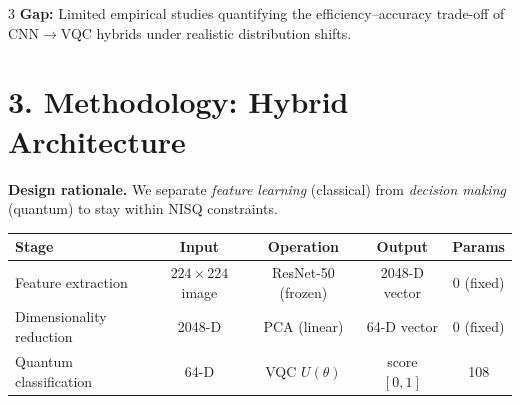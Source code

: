 \documentclass[a0,portrait]{a0poster}
\begin{document}
\begin{multicols}{3}
\noindent
\textbf{Gap:} Limited empirical studies quantifying the efficiency--accuracy trade-off of CNN\(\rightarrow\)VQC hybrids under realistic distribution shifts.


\color{UWBBlue}\section*{3. Methodology: Hybrid Architecture}
\color{TechGrey}

\noindent
\textbf{Design rationale.} We separate \textit{feature learning} (classical) from \textit{decision making} (quantum) to stay within NISQ constraints.
\begin{center}
\footnotesize
\begin{tabular}{lcccc}
\toprule
\textbf{Stage} & \textbf{Input} & \textbf{Operation} & \textbf{Output} & \textbf{Params} \\
\midrule
Feature extraction & \(224 \times 224\) image & ResNet-50 (frozen) & 2048-D vector & 0 (fixed) \\
Dimensionality reduction & 2048-D & PCA (linear) & 64-D vector & 0 (fixed) \\
Quantum classification & 64-D & VQC \(U(\theta)\) & score \([0,1]\) & 108 \\
\bottomrule
\end{tabular}
\end{center}

\vspace{0.2cm}

\begin{center}\vspace{0.2cm}
\end{center}


\end{multicols}
\end{document}
